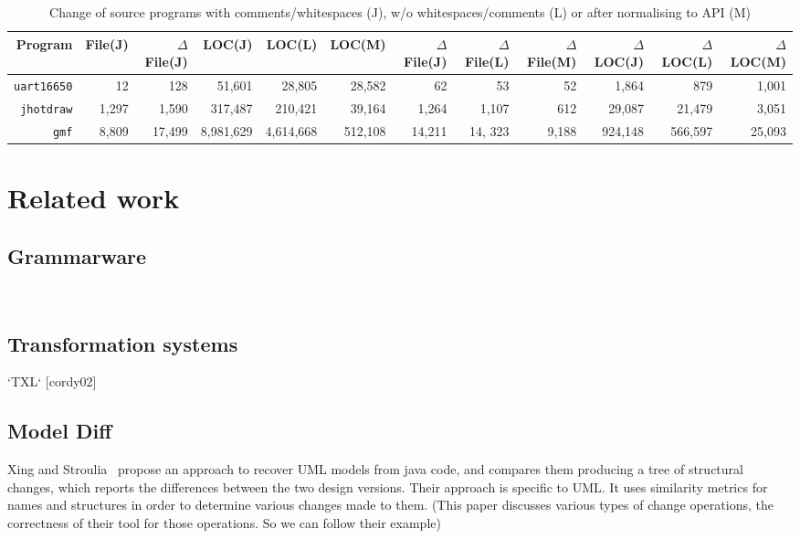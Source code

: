 \documentclass[10pt, conference, compsocconf]{IEEEtran}
\begin{document}
{\begin{table}\centering
\caption{Change of source programs with comments/whitespaces (J), w/o whitespaces/comments  (L) or after normalising to API (M)\label{table:3}}
\hspace*{-0.5cm}\begin{tabular}{| r || r | r || r | r | r || r| r|  r || r | r | r |}\hline
{\bf Program} & \footnotesize  File(J) & \footnotesize  $\Delta$File(J) & \footnotesize  LOC(J) & \footnotesize  LOC(L) & \footnotesize  LOC(M) & \footnotesize  $\Delta$ File(J)  & \footnotesize  \footnotesize $\Delta$ File(L) & \footnotesize  $\Delta$ File(M) & \footnotesize  $\Delta$ LOC(J) & \footnotesize  $\Delta$ LOC(L) & \footnotesize  $\Delta$ LOC(M) \\  \hline\hline
{\tt uart16650} & 12 & 128 & 51,601 & 28,805 & 28,582 & 62 & 53 & 52 & 1,864 & 879 & 1,001 \\\hline
{\tt jhotdraw} & 1,297 & 1,590 & 		317,487& 210,421 & 39,164 & 1,264 & 1,107 & 612 &	29,087 	& 21,479 & 3,051 \\\hline
{\tt gmf} & 8,809 & 17,499 & 8,981,629 & 4,614,668& 512,108& 14,211 &  14, 323& 9,188 & 924,148 & 566,597& 25,093 \\\hline
\hline\end{tabular}
\end{table}



\section{Related work}\label{sec:related}
\subsection{Grammarware}
 
~\cite{klint05tosem}
   
\subsection{Transformation systems}

   `TXL` [cordy02]
   
\subsection{Model Diff}
Xing and Stroulia~\cite{xing05ase} propose an approach to recover UML models from java code, and compares them producing a tree of structural changes, which reports the differences between the
two design versions.  Their approach is specific to UML. It uses similarity metrics for names and structures in order to determine various changes made to them. (This paper discusses various types of change operations, the correctness of their tool for those operations. So we can follow their example)

}
\end{document}
